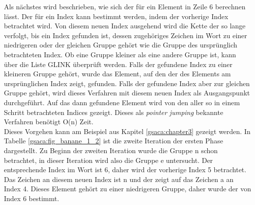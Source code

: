 Als nächstes wird beschrieben, wie sich der \prevpointer für ein Element in Zeile 6 berechnen lässt. 
Der \prevpointer für ein Index kann bestimmt werden, indem der vorherige Index betrachtet wird. 
Von diesem neuen Index ausgehend wird die Kette der \prevpointer so lange verfolgt, bis ein Index gefunden ist, dessen zugehöriges Zeichen im Wort zu einer niedrigeren oder der gleichen Gruppe gehört wie die Gruppe des ursprünglich betrachteten Index. 
Ob eine Gruppe kleiner als eine andere Gruppe ist, kann über die Liste GLINK überprüft werden. 
Falls der gefundene Index zu einer kleineren Gruppe gehört, wurde das Element, auf den der \prevpointer des Elements am ursprünglichen Index zeigt, gefunden. 
Falls der gefundene Index aber zur gleichen Gruppe gehört, wird dieses Verfahren mit diesem neuen Index als Ausgangspunkt durchgeführt. 
Auf das dann gefundene Element wird von den \prevpointern aller so in einem Schritt betrachteten Indices gezeigt. 
Dieses als \textit{pointer jumping} bekannte Verfahren benötigt O(n) Zeit.\\
Dieses Vorgehen kann am Beispiel aus Kapitel \ref{gsaca:chapter3} gezeigt werden. 
In Tabelle \ref{gsaca:fig_banane_1_2} ist die zweite Iteration der ersten Phase dargestellt. 
Zu Beginn der zweiten Iteration wurde die Gruppe n schon betrachtet, in dieser Iteration wird also die Gruppe e untersucht. 
Der entsprechende Index im Wort ist 6, daher wird der vorherige Index 5 betrachtet. 
Das Zeichen an diesem neuen Index ist n und der \prevpointer zeigt auf das Zeichen a an Index 4. 
Dieses Element gehört zu einer niedrigeren Gruppe, daher wurde der \prevpointer von Index 6 bestimmt.\\

